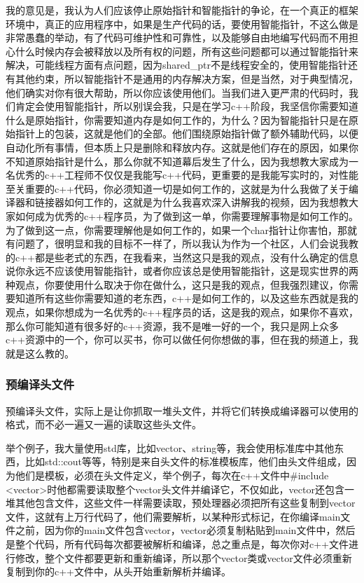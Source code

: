 我的意见是，我认为人们应该停止原始指针和智能指针的争论，在一个真正的框架环境中，真正的应用程序中，如果是生产代码的话，要使用智能指针，不这么做是非常愚蠢的举动，有了代码可维护性和可靠性，以及能够自由地编写代码而不用担心什么时候内存会被释放以及所有权的问题，所有这些问题都可以通过智能指针来解决，可能线程方面有点问题，因为{\ncodestyle shared_ptr}不是线程安全的，使用智能指针还有其他约束，所以智能指针不是通用的内存解决方案，但是当然，对于典型情况，他们确实对你有很大帮助，所以你应该使用他们。当我们进入更严肃的代码时，我们肯定会使用智能指针，所以别误会我，只是在学习c++阶段，我坚信你需要知道什么是原始指针，你需要知道内存是如何工作的，为什么？因为智能指针只是在原始指针上的包装，这就是他们的全部。他们围绕原始指针做了额外辅助代码，以便自动化所有事情，但本质上只是删除和释放内存。这就是他们存在的原因，如果你不知道原始指针是什么，那么你就不知道幕后发生了什么，因为我想教大家成为一名优秀的c++工程师不仅仅是我能写c++代码，更重要的是我能写实时的，对性能至关重要的c++代码，你必须知道一切是如何工作的，这就是为什么我做了关于编译器和链接器如何工作的，这就是为什么我喜欢深入讲解我的视频，因为我想教大家如何成为优秀的c++程序员，为了做到这一单，你需要理解事物是如何工作的。为了做到这一点，你需要理解他是如何工作的，如果一个{\ncodestyle char}指针让你害怕，那就有问题了，很明显和我的目标不一样了，所以我认为作为一个社区，人们会说我教的c++都是些老式的东西，在我看来，当然这只是我的观点，没有什么确定的信息说你永远不应该使用智能指针，或者你应该总是使用智能指针，这是现实世界的两种观点，你要使用什么取决于你在做什么，这只是我的观点，但我强烈建议，你需要知道所有这些你需要知道的老东西，c++是如何工作的，以及这些东西就是我的观点，如果你想成为一名优秀的c++程序员的话，这是我的观点，如果你不喜欢，那么你可能知道有很多好的c++资源，我不是唯一好的一个，我只是网上众多c++资源中的一个，你可以买书，你可以做任何你想做的事，但在我的频道上，我就是这么教的。


\subsubsection{预编译头文件}


预编译头文件，实际上是让你抓取一堆头文件，并将它们转换成编译器可以使用的格式，而不必一遍又一遍的读取这些头文件。

举个例子，我大量使用std库，比如{\ncodestyle vector}、{\ncodestyle string}等，我会使用标准库中其他东西，比如{\ncodestyle std::cout}等等，特别是来自头文件的标准模板库，他们由头文件组成，因为他们是模板，必须在头文件定义，举个例子，每次在c++文件中{\ncodestyle \#include <vector>}时他都需要读取整个vector头文件并编译它，不仅如此，vector还包含一堆其他包含文件，这些文件一样需要读取，预处理器必须把所有这些复制到vector文件，这就有上万行代码了，他们需要解析，以某种形式标记，在你编译main文件之前，因为你的main文件包含vector，vector必须复制粘贴到main文件中，然后是整个代码，所有代码每次都要被解析和编译，总之重点是，每次你对c++文件进行修改，整个文件都要更新和重新编译，所以那个vector类或vector文件必须重新复制到你的c++文件中，从头开始重新解析并编译。

